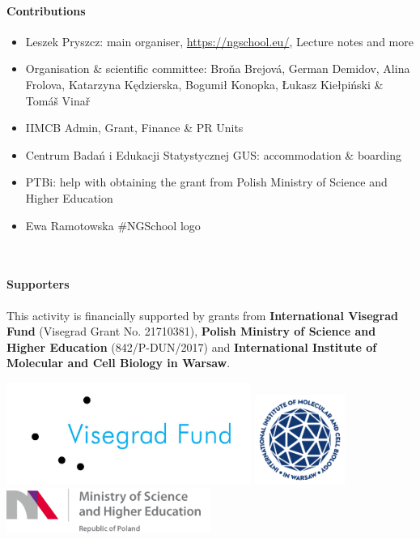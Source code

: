 \documentclass[a4paper,11pt]{book}
\def\iimcb{International Institute of Molecular and Cell Biology in Warsaw}
\begin{document}
\paragraph{Contributions}
\begin{itemize}
\item Leszek Pryszcz: main organiser, \url{https://ngschool.eu/}, Lecture notes and more
\item Organisation \& scientific committee: Bro\v{n}a Brejov\'a, German Demidov, Alina Frolova,
  Katarzyna Kędzierska, Bogumił Konopka, Łukasz Kiełpi\'nski \& Tom\'a\v{s} Vina\v{r}
\item IIMCB Admin, Grant, Finance \& PR Units
\item Centrum Badań i Edukacji Statystycznej GUS: accommodation \& boarding
\item PTBi: help with obtaining the grant from Polish Ministry of Science and Higher Education
\item Ewa Ramotowska \#NGSchool logo
\end{itemize}

~\vfill
\paragraph{Supporters}
This activity is financially supported by grants from {\bf International Visegrad Fund} (Visegrad Grant No. 21710381),
{\bf Polish Ministry of Science and Higher Education} (842/P-DUN/2017) 
and {\bf \iimcb}. 

\smallskip
\begin{center}
\includegraphics[width=0.6\textwidth]{logs/ivf.jpg}
\includegraphics[width=0.22\textwidth]{logs/iimcb.png}
\includegraphics[width=0.5\textwidth]{logs/mnisw.png}
\end{center}
\end{document}
